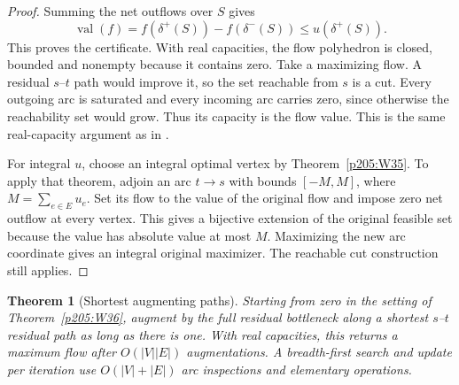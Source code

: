 \documentclass[11pt,oneside,openany]{book}
\theoremstyle{plain}
\newtheorem{theorem}{Theorem}[chapter]
\theoremstyle{definition}
\theoremstyle{remark}
\begin{document}
\begin{proof}
Summing the net outflows over \(S\) gives
\[
     \operatorname{val}(f)=f(\delta^+(S))-f(\delta^-(S))
                            \le u(\delta^+(S)).
\]
This proves the certificate. With real capacities, the flow
polyhedron is closed, bounded and nonempty because it contains
zero. Take a maximizing flow. A residual \(s\)--\(t\) path would
improve it, so the set reachable from \(s\) is a cut. Every
outgoing arc is saturated and every incoming arc carries zero,
since otherwise the reachability set would grow. Thus its
capacity is the flow value. This is the same real-capacity
argument as in \cite[Chapter 7, W44--W46]{p204}.

For integral \(u\), choose an integral optimal vertex by
Theorem~\ref{p205:W35}. To apply that theorem, adjoin an arc
\(t\to s\) with bounds \([-M,M]\), where
\(M=\sum_{e\in E}u_e\). Set its flow to the value of the
original flow and impose zero net outflow at every vertex.
This gives a bijective extension of the original feasible set
because the value has absolute value at most \(M\). Maximizing
the new arc coordinate gives an integral original maximizer.
The reachable cut construction still applies.
\end{proof}

\begin{theorem}[Shortest augmenting paths]\label{p205:W37}
Starting from zero in the setting of Theorem~\ref{p205:W36},
augment by the full residual bottleneck along a shortest
\(s\)--\(t\) residual path as long as there is one. With real
capacities, this returns a maximum flow after \(O(|V||E|)\)
augmentations. A breadth-first search and update per iteration
use \(O(|V|+|E|)\) arc inspections and elementary operations.
\end{theorem}
\end{document}
